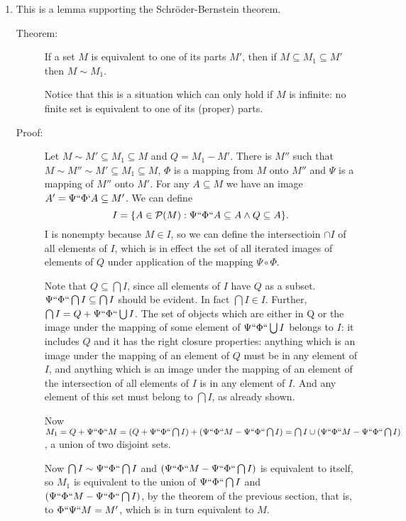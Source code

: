 \documentclass[12pt]{article}
\begin{document}
\begin{enumerate}
\item This is a lemma supporting the Schr\"oder-Bernstein theorem.

\begin{description}

\item[Theorem:]  If a set $M$ is equivalent to one of its parts $M'$, then if $M \subseteq M_1 \subseteq M'$ then $M \sim M_1$.

Notice that this is a situation which can only hold if $M$ is infinite:  no finite set is equivalent to one of its (proper) parts.

\item[Proof:]  Let $M \sim M' \subseteq M_1 \subseteq M$ and $Q = M_1-M'$.  There is $M''$ such that $M \sim M'' \sim M' \subseteq M_1 \subseteq M$, $\Phi$ is a mapping from
$M$ onto $M''$ and $\Psi$ is a mapping of $M''$ onto $M'$.  For any $A \subseteq M$ we have an image $A' =\Psi``\Phi`A \subseteq M'$.  We can define $$I = \{A \in {\cal P}(M):\Psi``\Phi``A \subseteq A \wedge Q \subseteq A\}.$$  I is nonempty because $M \in I$, so we can define the intersectioin $\cap I$ of all elements of $I$, which is in effect the set
of all iterated images of elements of $Q$ under application of the mapping $\Psi \circ \Phi$.

Note that $Q \subseteq \bigcap I$, since all elements of $I$ have $Q$ as a subset.  $\Psi``\Phi``\bigcap I \subseteq \bigcap I$ should be evident.  In fact $\bigcap I \in I$.
Further, $\bigcap I = Q + \Psi``\Phi``\bigcup I$.  The set of objects which are either in Q or the image under the mapping of some element of $\Psi``\Phi``\bigcup I$ belongs to $I$:  it includes $Q$ and it has the right closure properties:  anything which is an image under the mapping of an element of $Q$ must be in any element of $I$, and anything which is
an image under the mapping of an element of the intersection of all elements of $I$ is in any element of $I$.  And any element of this set must belong to $\bigcap I$, as already shown.

Now $M_1 = Q+\Psi``\Phi``M = (Q + \Psi``\Phi``\bigcap I) + (\Psi``\Phi``M - \Psi``\Phi``\bigcap I) = \bigcap I \cup  (\Psi``\Phi``M - \Psi``\Phi``\bigcap I)$,
a union of two disjoint sets.

Now $\bigcap I \sim \Psi``\Phi``\bigcap I$ and $(\Psi``\Phi``M - \Psi``\Phi``\bigcap I)$ is equivalent to itself, so $M_1$ is equivalent to the union of
$\Psi``\Phi``\bigcap I$  and $(\Psi``\Phi``M - \Psi``\Phi``\bigcap I)$, by the theorem of the previous section, that is, to $\Phi``\Psi``M = M'$, which is in turn equivalent to $M$.




\end{description}
\end{enumerate}
\end{document}
